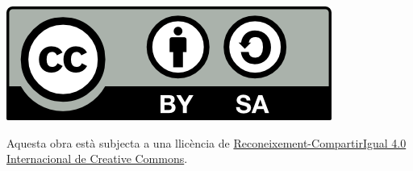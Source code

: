%
%
%

\thispagestyle{empty}

\vspace*{\fill}

\begin{center}
\includegraphics[scale=1]{./assets/cc-by-sa.png}

{\small Aquesta obra està subjecta a una llicència de \href{http://creativecommons.org/licenses/by-sa/4.0/deed.ca}{Reconeixement-CompartirIgual 4.0 Internacional de Creative Commons}.}
\end{center}\\

\newpage
